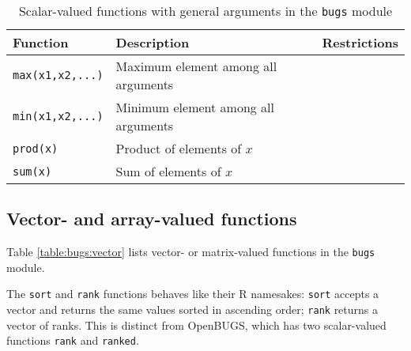 \documentclass[11pt, a4paper, titlepage]{report}
\newcommand{\OpenBUGS}{\textsf{OpenBUGS}}
\begin{document}
\begin{table}[h!]
\begin{center}
\begin{tabular}{lll}
\hline
Function & Description & Restrictions \\
\hline
\verb+max(x1,x2,...)+ & Maximum element among all arguments & \\
\verb+min(x1,x2,...)+ & Minimum element among all arguments & \\
\verb+prod(x)+  & Product of elements of $x$ & \\
\verb+sum(x)+   & Sum of elements of $x$& \\
\hline
\end{tabular}
\caption{Scalar-valued functions with general
  arguments in the \texttt{bugs} module \label{table:bugs:scalar2}}
\end{center}
\end{table}

\subsection{Vector- and array-valued functions}

Table \ref{table:bugs:vector} lists vector- or matrix-valued functions
in the \texttt{bugs} module.

The \texttt{sort} and \texttt{rank} functions behaves like their R
namesakes: \texttt{sort} accepts a vector and returns the same values
sorted in ascending order; \texttt{rank} returns a vector of ranks.
This is distinct from \OpenBUGS, which has two scalar-valued functions
\verb+rank+ and \verb+ranked+.
\end{document}
